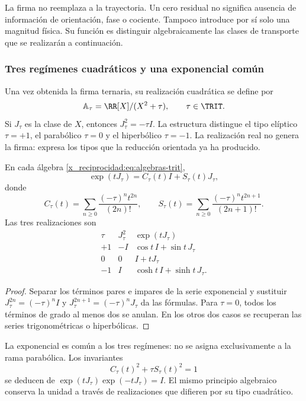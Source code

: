 La firma no reemplaza a la trayectoria. Un cero residual no significa ausencia de información de orientación, fase o cociente. Tampoco introduce por sí solo una magnitud física. Su función es distinguir algebraicamente las clases de transporte que se realizarán a continuación.

\subsubsection{Tres regímenes cuadráticos y una exponencial común}

Una vez obtenida la firma ternaria, su realización cuadrática se define por
\begin{equation}
 \mathbb A_\tau=\RR[X]/(X^2+\tau),\qquad \tau\in\TRIT.
 \label{x_reciprocidad:eq:algebras-trit}
\end{equation}
Si \(J_\tau\) es la clase de \(X\), entonces \(J_\tau^2=-\tau I\). La estructura distingue el tipo elíptico \(\tau=+1\), el parabólico \(\tau=0\) y el hiperbólico \(\tau=-1\). La realización real no genera la firma: expresa los tipos que la reducción orientada ya ha producido.

\begin{proposition}
En cada álgebra \eqref{x_reciprocidad:eq:algebras-trit},
\begin{equation}
 \exp(tJ_\tau)=C_\tau(t)I+S_\tau(t)J_\tau,
\end{equation}
donde
\[
 C_\tau(t)=\sum_{n\ge0}\frac{(-\tau)^nt^{2n}}{(2n)!},\qquad
 S_\tau(t)=\sum_{n\ge0}\frac{(-\tau)^nt^{2n+1}}{(2n+1)!}.
\]
Las tres realizaciones son
\[
 \begin{array}{c|c|c}
 \tau&J_\tau^2&\exp(tJ_\tau)\\\hline
 +1&-I&\cos t\,I+\sin t\,J_\tau\\
 0&0&I+tJ_\tau\\
 -1&I&\cosh t\,I+\sinh t\,J_\tau.
 \end{array}
\]
\end{proposition}
\begin{proof}
Separar los términos pares e impares de la serie exponencial y sustituir \(J_\tau^{2n}=(-\tau)^nI\) y \(J_\tau^{2n+1}=(-\tau)^nJ_\tau\) da las fórmulas. Para \(\tau=0\), todos los términos de grado al menos dos se anulan. En los otros dos casos se recuperan las series trigonométricas o hiperbólicas.
\end{proof}

La exponencial es común a los tres regímenes: no se asigna exclusivamente a la rama parabólica. Los invariantes
\[
 C_\tau(t)^2+\tau S_\tau(t)^2=1
\]
se deducen de \(\exp(tJ_\tau)\exp(-tJ_\tau)=I\). El mismo principio algebraico conserva la unidad a través de realizaciones que difieren por su tipo cuadrático.

